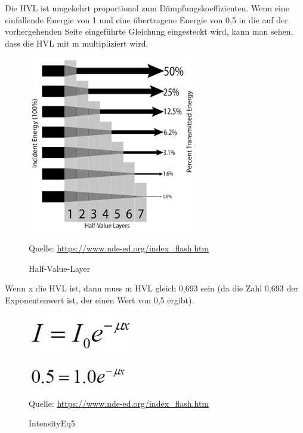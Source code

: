 Die HVL ist umgekehrt proportional zum Dämpfungskoeffizienten. Wenn eine einfallende Energie von 1 und eine übertragene Energie von 0,5 in die auf der vorhergehenden Seite eingeführte Gleichung eingesteckt wird, kann man sehen, dass die HVL mit m multipliziert wird.
 \begin{figure}[htb]
 \centering 
  \includegraphics[scale=0.9]{img/Half-Value-Layer.png}
  \caption{Half-Value-Layer}
  \label{fig:Half-Value-Layer}
   Quelle: \url{https://www.nde-ed.org/index_flash.htm}
  \end{figure}


Wenn x die HVL ist, dann muss m HVL gleich 0,693 sein (da die Zahl 0,693 der Exponentenwert ist, der einen Wert von 0,5 ergibt).

\begin{figure}[htb]
  \centering  
  \includegraphics[scale=0.5]{img/Die_Kurve_Formel.jpg}
\end{figure}

\begin{figure}[htb]
  \centering  
  \includegraphics[scale=0.5]{img/IntensityEq5.jpg}
  \caption{IntensityEq5}
  \label{fig:IntensityEq5}
   Quelle: \url{https://www.nde-ed.org/index_flash.htm}
\end{figure}

